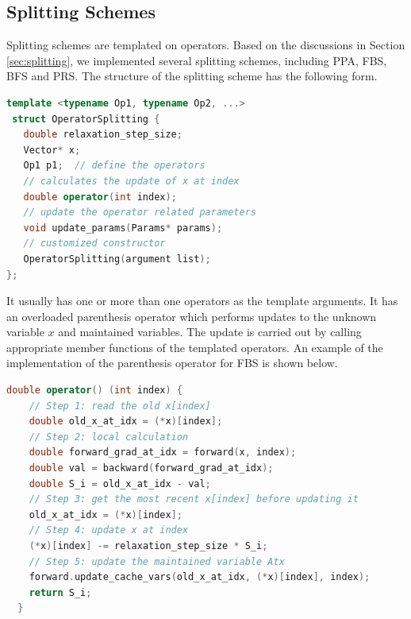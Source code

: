 \subsection{Splitting Schemes}
Splitting schemes are templated on operators. Based on the discussions in Section \ref{sec:splitting}, we implemented several splitting schemes, including PPA, FBS, BFS and PRS. The structure of the splitting scheme has the following form. 
 \begin{lstlisting}[language=c++]
 template <typename Op1, typename Op2, ...>
 struct OperatorSplitting {
   double relaxation_step_size; 
   Vector* x;
   Op1 p1;  // define the operators
   // calculates the update of x at index
   double operator(int index);
   // update the operator related parameters
   void update_params(Params* params);
   // customized constructor
   OperatorSplitting(argument list);
};
\end{lstlisting}
It usually has one or more than one operators as the template arguments. It has an overloaded parenthesis operator which performs updates to the unknown variable $x$ and maintained variables. The update is carried out by calling appropriate member functions of the templated operators. An example of the implementation of the parenthesis operator for FBS is shown below. 
\begin{lstlisting}[language=c++]
  double operator() (int index) {
    // Step 1: read the old x[index]
    double old_x_at_idx = (*x)[index]; 
    // Step 2: local calculation
    double forward_grad_at_idx = forward(x, index);
    double val = backward(forward_grad_at_idx);
    double S_i = old_x_at_idx - val;
    // Step 3: get the most recent x[index] before updating it
    old_x_at_idx = (*x)[index];
    // Step 4: update x at index 
    (*x)[index] -= relaxation_step_size * S_i;    
    // Step 5: update the maintained variable Atx
    forward.update_cache_vars(old_x_at_idx, (*x)[index], index);
    return S_i;
  }
\end{lstlisting}



